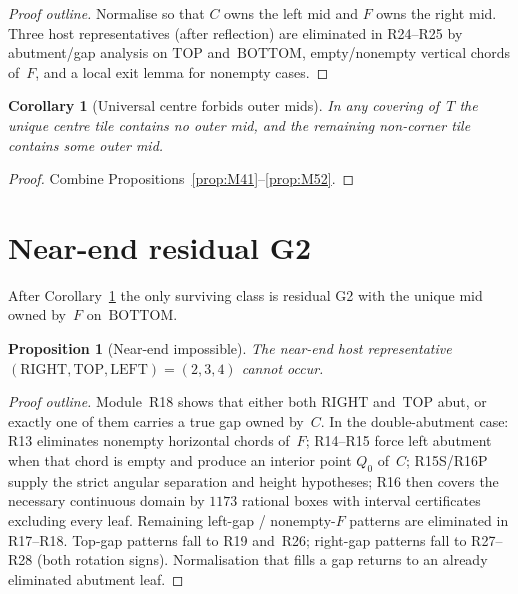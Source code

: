 \documentclass[11pt,reqno]{amsart}
\newtheorem{proposition}[theorem]{Proposition}
\newtheorem{corollary}[theorem]{Corollary}
\theoremstyle{definition}
\newcommand{\BOTTOM}{\mathrm{BOTTOM}}
\newcommand{\RIGHT}{\mathrm{RIGHT}}
\newcommand{\TOP}{\mathrm{TOP}}
\newcommand{\LEFT}{\mathrm{LEFT}}
\begin{document}
\begin{proof}[Proof outline]
Normalise so that $C$ owns the left mid and $F$ owns the right mid.  Three host
representatives (after reflection) are eliminated in R24--R25 by abutment/gap
analysis on $\TOP$ and~$\BOTTOM$, empty/nonempty vertical chords of~$F$, and a
local exit lemma for nonempty cases.
\end{proof}

\begin{corollary}[Universal centre forbids outer mids]\label{cor:M53}
In any covering of~$T$ the unique centre tile contains no outer mid, and the
remaining non-corner tile contains some outer mid.
\end{corollary}

\begin{proof}
Combine Propositions~\ref{prop:M41}--\ref{prop:M52}.
\end{proof}

\section{Near-end residual G2}\label{sec:near}

After Corollary~\ref{cor:M53} the only surviving class is residual G2 with the
unique mid owned by~$F$ on~$\BOTTOM$.

\begin{proposition}[Near-end impossible]\label{prop:M61}
The near-end host representative
$(\RIGHT,\TOP,\LEFT)=(2,3,4)$ cannot occur.
\end{proposition}

\begin{proof}[Proof outline]
Module~R18 shows that either both $\RIGHT$ and~$\TOP$ abut, or exactly one of
them carries a true gap owned by~$C$.  In the double-abutment case:
R13 eliminates nonempty horizontal chords of~$F$; R14--R15 force left abutment
when that chord is empty and produce an interior point $Q_0$ of~$C$;
R15S/R16P supply the strict angular separation and height hypotheses; R16 then
covers the necessary continuous domain by $1173$ rational boxes with interval
certificates excluding every leaf.  Remaining left-gap / nonempty-$F$ patterns
are eliminated in R17--R18.  Top-gap patterns fall to R19 and~R26; right-gap
patterns fall to R27--R28 (both rotation signs).  Normalisation that fills a
gap returns to an already eliminated abutment leaf.
\end{proof}
\end{document}
